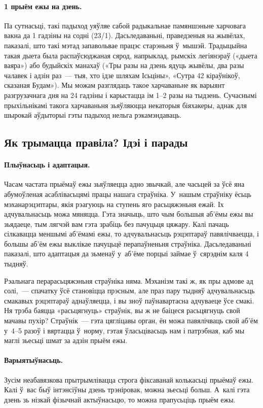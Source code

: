 \paragraph{1 прыём ежы на дзень.}
Па сутнасьці, такі падыход уяўляе сабой радыкальнае памяншэньне харчовага вакна да 1 гадзіны на содні (23/1). Дасьледаваньні, праведзеныя на жывёлах, паказалі, што такі мэтад запавольвае працэс старэньня ў~мышэй. Традыцыйна такая дыета была распаўсюджаная сярод, напрыклад, рымскіх легіянэраў («дыета ваяра») або будыйскіх манахаў («Тры разы на дзень ядуць жывёлы, два разы чалавек і адзін раз~--- тыя, хто ідзе шляхам Ісьціны», «Сутра 42 кіраўнікоў, сказаная Будам»). Мы можам разглядаць такое харчаваньне як варыянт разгрузачнага дня на 24 гадзіны і карыстацца ім 1--2 разы на тыдзень. Сучаснымі прыхільнікамі такога харчаваньня зьяўляюцца некаторыя біяхакеры, аднак для шырокай аўдыторыі гэты падыход нельга рэкамэндаваць.

\subsection{Як трымацца правіла? Ідэі і парады}

\paragraph{Плыўнасьць і адаптацыя.}
Часам частата прыёмаў ежы зьяўляецца адно звычкай, але часьцей за ўсё яна абумоўленая асаблівасьцямі працы нашага страўніка. У~нашым страўніку ёсьць мэханарэцэптары, якія рэагуюць на ступень яго расьцяжэньня ежай. Іх адчувальнасьць можа мяняцца. Гэта значыць, што чым большыя аб'ёмы ежы вы зьядаеце, тым лягчэй вам гэта зрабіць без пачуцьця цяжару. Калі пачаць сілкавацца меншымі аб'ёмамі ежы, то адчувальнасьць рэцэптараў павялічваецца, і большы аб'ём ежы выклікае пачуцьцё перапаўненьня страўніка. Дасьледаваньні паказалі, што адаптацыя да зьменаў у~аб'ёме порцыі займае ў~сярэднім каля 4 тыдняў.

Рэальнага перарасьцяжэньня страўніка няма. Мэханізм такі ж, як пры адмове ад солі,~--- спачатку ўсё становіцца прэсным, але праз пару тыдняў адчувальнасьць смакавых рэцэптараў аднаўляецца, і вы зноў паўнавартасна адчуваеце ўсе смакі. Ня трэба баяцца «расьцягнуць» страўнік, вы ж не баіцеся расьцягнуць свой мачавы пухір? Страўнік~--- гэта цягліцавы орган, ён можа павялічваць свой аб'ём у~4--5 разоў і вяртацца ў~норму, гэтая ўласьцівасьць нам і патрэбная, каб мы маглі зьесьці шмат за адзін прыём ежы.

\paragraph{Варыятыўнасьць.}
Зусім неабавязкова прытрымлівацца стро\-га фіксаванай колькасьці прыёмаў ежы. Калі ў~вас быў інтэнсіўны дзень трэніровак, можна зьесьці больш. А~калі гэта дзень зь нізкай фізычнай актыўнасьцю, то можна прапусьціць прыём ежы.

